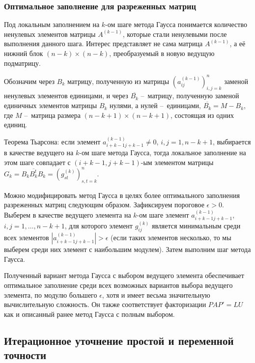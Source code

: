 \subsubsection{Оптимальное заполнение для разреженных матриц}

Под локальным заполнением на $k$-ом шаге метода Гаусса понимается количество ненулевых элементов матрицы $A^{(k-1)}$, которые стали ненулевыми после выполнения данного шага. Интерес представляет не сама матрица $A^{(k-1)}$, а её нижний блок $(n-k)\times(n-k)$, преобразуемый в новую ведущую подматрицу. 

Обозначим через $B_k$ матрицу, полученную из матрицы $(a_{ij}^{(k-1)})^{n}_{i,j=k}$ заменой ненулевых элементов единицами, и через $\overline{B_k}$ – матрицу, полученную заменой единичных элементов матрицы $B_k$ нулями, а нулей – единицами, $\overline{B_k}=M - B_k$, где $M$ – матрица размера $(n-k+1)\times(n-k+1)$, состоящая из одних единиц. 

Теорема Тьарсона: если элемент $a^{(k-1)}_{i+k-1j+k-1} \ne 0$, $i,j=1, n-k+1$, выбирается в качестве ведущего на $k$-ом шаге метода Гаусса, тогда локальное заполнение на этом шаге совпадает с $(i+k-1, j+k-1)$-ым элементом матрицы $G_k = B_k \overline{B_{k}^{t}} B_k = ( g^{(k)}_{st} )^{n}_{s,t=k}$.

Можно модифицировать метод Гаусса в целях более оптимального заполнения разреженных матриц следующим образом. Зафиксируем пороговое $\epsilon > 0$. Выберем в качестве ведущего элемента на $k$-ом шаге элемент $a^{(k-1)}_{i+k-1 j+k-1}$, $i, j = 1, \hdots, n-k+1$, для которого элемент $g^{(k)}_{ij}$ является минимальным среди всех элементов $ |a^{(k-1)}_{i+k-1 j+k-1} | > \epsilon $ (если таких элементов несколько, то мы выберем среди них элемент с наибольшим модулем). Затем выполним шаг метода Гаусса. 

Полученный вариант метода Гаусса с выбором ведущего элемента обеспечивает оптимальное заполнение среди всех возможных вариантов выбора ведущего элемента, по модулю большего $\epsilon$, хотя и имеет весьма значительную вычислительную сложность. Он также соответствует факторизации $PAP'=LU$ как и описанный ранее метод Гаусса с полным выбором. 

\subsection{Итерационное уточнение простой и переменной точности}

